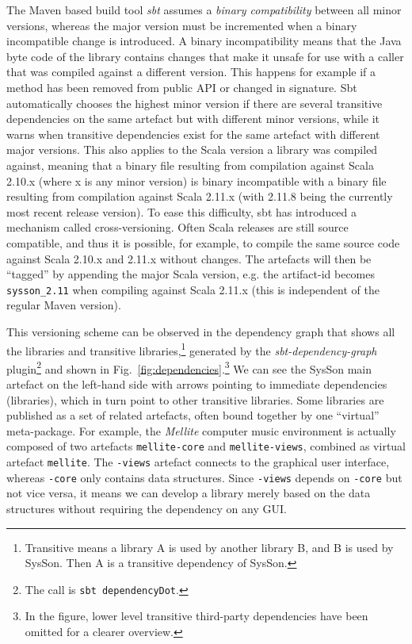 \documentclass[11pt,a4paper]{article}
\newcommand{\figref}[1]{Fig.~\ref{#1}}
\newcommand{\software}[1]{\textit{#1}}
\newcommand{\sysson}[0]{SysSon}
\begin{document}
The Maven based build tool \software{sbt} assumes a \emph{binary compatibility} between all minor versions, whereas the major version must be incremented when a binary incompatible change is introduced. A binary incompatibility means that the Java byte code of the library contains changes that make it unsafe for use with a caller that was compiled against a different version. This happens for example if a method has been removed from public API or changed in signature. Sbt automatically chooses the highest minor version if there are several transitive dependencies on the same artefact but with different minor versions, while it warns when transitive dependencies exist for the same artefact with different major versions. This also applies to the Scala version a library was compiled against, meaning that a binary file resulting from compilation against Scala 2.10.x (where x is any minor version) is binary incompatible with a binary file resulting from compilation against Scala 2.11.x (with 2.11.8 being the currently most recent release version). To ease this difficulty, sbt has introduced a mechanism called cross-versioning. Often Scala releases are still source compatible, and thus it is possible, for example, to compile the same source code against Scala 2.10.x and 2.11.x without changes. The artefacts will then be ``tagged'' by appending the major Scala version, e.g. the artifact-id becomes \verb!sysson_2.11! when compiling against Scala 2.11.x (this is independent of the regular Maven version).

This versioning scheme can be observed in the dependency graph that shows all the libraries and transitive libraries,\footnote{Transitive means a library A is used by another library B, and B is used by \sysson{}. Then A is a transitive dependency of \sysson{}.} generated by the \software{sbt-dependency-graph} plugin\footnote{The call is \verb!sbt dependencyDot!.} and shown in \figref{fig:dependencies}.\footnote{In the figure, lower level transitive third-party dependencies have been omitted for a clearer overview.} We can see the \sysson{} main artefact on the left-hand side with arrows pointing to immediate dependencies (libraries), which in turn point to other transitive libraries. Some libraries are published as a set of related artefacts, often bound together by one ``virtual'' meta-package. For example, the \software{Mellite} computer music environment is actually composed of two artefacts \verb!mellite-core! and \verb!mellite-views!, combined as virtual artefact \verb!mellite!. The \verb!-views! artefact connects to the graphical user interface, whereas \verb!-core! only contains data structures. Since \verb!-views! depends on \verb!-core! but not vice versa, it means we can develop a library merely based on the data structures without requiring the dependency on any GUI.
\end{document}
